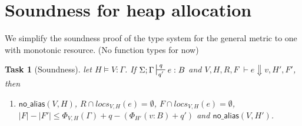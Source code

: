 \documentclass[11pt]{article}
\newcounter{group}
\newtheorem{theorem}{Task}[group]
\newcommand{\na}[2]{\mathsf{no\_alias}(#1,#2)}
\begin{document}
\section{Soundness for heap allocation}

We simplify the soundness proof of the type system for the general metric to one with monotonic resource.
(No function types for now)

\begin{theorem}[Soundness]
\label{a} let $H \vDash V : \Gamma$. If $\Sigma; \Gamma \sststile{q'}{q} e : B$
and $V,H,R,F \; \vdash e \Downarrow v, H', F'$, then 
\begin{enumerate}
  \item {} $\na{V}{H}$, $R \cap locs_{V,H}(e) = \emptyset$,  $F \cap locs_{V,H}(e) = \emptyset$, 
         $|F| - |F'| \le \Phi_{V,H}(\Gamma) +q - (\Phi_{H'}(v:B) + q')$ and $\na{V}{H'}$.
\end{enumerate}
\end{theorem}
\end{document}
